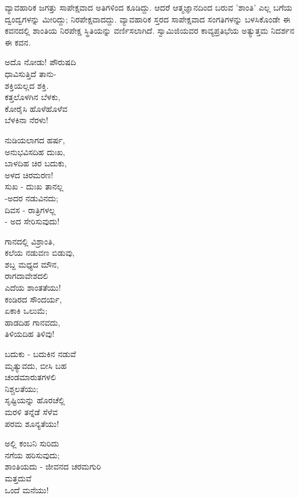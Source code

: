 ವ್ಯಾವಹಾರಿಕ ಜಗತ್ತು ಸಾಪೇಕ್ಷವಾದ ಅತಿಗಳಿಂದ ಕೂಡಿದ್ದು. ಆದರೆ ಆತ್ಮಜ್ಞಾನದಿಂದ ಬರುವ 'ಶಾಂತಿ' ಎಲ್ಲ ಬಗೆಯ ದ್ವಂದ್ವಗಳನ್ನು ಮೀರಿದ್ದು; ನಿರಪೇಕ್ಷವಾದದ್ದು. ವ್ಯಾವಹಾರಿಕ ಸ್ತರದ ಸಾಪೇಕ್ಷವಾದ ಸಂಗತಿಗಳನ್ನು ಬಳಸಿಕೊಂಡೇ ಈ ಕವನದಲ್ಲಿ ಶಾಂತಿಯ ನಿರಪೇಕ್ಷ ಸ್ಥಿತಿಯನ್ನು ವರ್ಣಿಸಲಾಗಿದೆ. ಸ್ವಾಮಿಜಿಯವರ ಕಾವ್ಯಪ್ರತಿಭೆಯ ಅತ್ಯುತ್ತಮ ನಿದರ್ಶನ ಈ ಕವನ.

\begin{myquote}
ಅದೊ ನೋಡು! ಪೌರುಷದಿ\\ಧಾವಿಸುತ್ತಿದೆ ತಾನು-\\ಶಕ್ತಿಯಲ್ಲದ ಶಕ್ತಿ.\\ಕತ್ತಲೊಳಗಿನ ಬೆಳಕು,\\ಕೋರೈಸಿ ಹೊಳೆಹೊಳೆವ\\ಬೆಳಕಿನಾ ನೆರಳು!
\end{myquote}

\begin{myquote}
ನುಡಿಯಲಾಗದ ಹರ್ಷ,\\ಅನುಭವಿಸದಿಹ ದುಃಖ,\\ಬಾಳದಿಹ ಚಿರ ಬದುಕು,\\ಅಳದ ಚಿರಮರಣ!\\ಸುಖ - ದುಃಖ ತಾನಲ್ಲ\\-ಅದರ ನಡುವಿನದು;\\ದಿವಸ - ರಾತ್ರಿಗಳಲ್ಲ\\- ಅದ ಸೇರಿಸುವುದು!
\end{myquote}

\begin{myquote}
ಗಾನದಲ್ಲಿ ವಿಶ್ರಾಂತಿ,\\ಕಲೆಯ ನಡುವಣ ಬಿಡುವು,\\ಶಬ್ದ ಮಧ್ಯದ ಮೌನ,\\ರಾಗದಾವೇಶದಲಿ\\ಎದೆಯ ಶಾಂತತೆಯು!\\ಕಂಡಿರದ ಸೌಂದರ್ಯ,\\ಏಕಾಕಿ ಒಲುಮೆ;\\ಹಾಡದಿಹ ಗಾನವದು,\\ತಿಳಿಯದಿಹ ತಿಳಿವು!
\end{myquote}

\begin{myquote}
ಬದುಕು - ಬದುಕಿನ ನಡುವೆ\\ಮೃತ್ಯುವದು, ಬೀಸಿ ಬಹ\\ಚಂಡಮಾರುತಗಳಲಿ\\ನಿಶ್ಚಲತೆಯು;\\ಸೃಷ್ಟಿಯನ್ನು ಹೊರಚೆಲ್ಲಿ\\ಮರಳಿ ತನ್ನೆಡೆ ಸೆಳೆವ\\ಪರಮ ಶೂನ್ಯತೆಯು!
\end{myquote}

\begin{myquote}
ಅಲ್ಲಿ ಕಂಬನಿ ಸುರಿದು\\ನಗೆಯ ಹರಿಸುವುದು;\\ಶಾಂತಿಯದು - ಜೀವನದ ಚರಮಗುರಿ\\ಮತ್ತದುವೆ\\ಒಂದೆ ಮನೆಯು!
\end{myquote}

